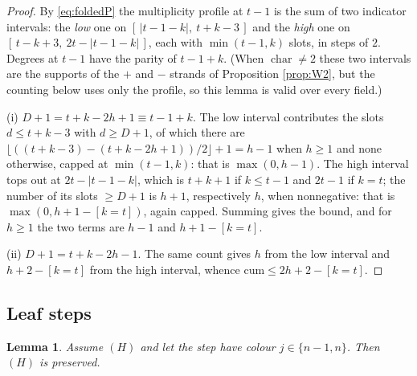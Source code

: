 \documentclass[reqno]{amsart}
\theoremstyle{plain}
\newtheorem{lemma}[theorem]{Lemma}
\theoremstyle{definition}
\begin{document}
\begin{proof}
By \eqref{eq:foldedP} the multiplicity profile at $t-1$ is the sum of two
indicator intervals: the \emph{low} one on $[\,|t-1-k|,\ t+k-3\,]$ and the
\emph{high} one on $[\,t-k+3,\ 2t-|t-1-k|\,]$, each with $\min(t-1,k)$ slots,
in steps of $2$.  Degrees at $t-1$ have the parity of $t-1+k$.  (When
$\operatorname{char}\ne2$ these two intervals are the supports of the $+$ and
$-$ strands of Proposition \ref{prop:W2}, but the counting below uses only the
profile, so this lemma is valid over every field.)

(i) $D+1=t+k-2h+1\equiv t-1+k$.  The low interval contributes the slots
$d\le t+k-3$ with $d\ge D+1$, of which there are
$\lfloor((t+k-3)-(t+k-2h+1))/2\rfloor+1=h-1$ when $h\ge1$ and none otherwise,
capped at $\min(t-1,k)$: that is $\max(0,h-1)$.  The high interval tops out at
$2t-|t-1-k|$, which is $t+k+1$ if $k\le t-1$ and $2t-1$ if $k=t$; the number of
its slots $\ge D+1$ is $h+1$, respectively $h$, when nonnegative: that is
$\max(0,h+1-[k=t])$, again capped.  Summing gives the bound, and for $h\ge1$
the two terms are $h-1$ and $h+1-[k=t]$.

(ii) $D+1=t+k-2h-1$.  The same count gives $h$ from the low interval and
$h+2-[k=t]$ from the high interval, whence $\mathrm{cum}\le 2h+2-[k=t]$.
\end{proof}

\subsection{Leaf steps}\label{ss:leafsteps}

\begin{lemma}\label{lem:leafstep}
Assume $(H)$ and let the step have colour $j\in\{n-1,n\}$.  Then $(H)$ is
preserved.
\end{lemma}
\end{document}
